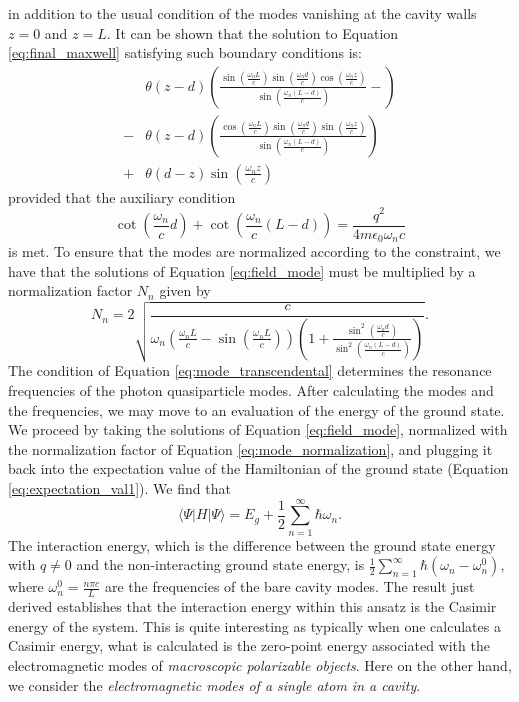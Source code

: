 \documentclass[aps,prb,twocolumn,
	groupedaddress,superscriptaddress,
	amsfonts,amssymb,amsmath,floatfix,
	citeautoscript]{revtex4-1}
\begin{document}
in addition to the usual condition of the modes vanishing at the cavity walls $z=0$ and $z=L$. It can be shown that the solution to Equation \ref{eq:final_maxwell} satisfying such boundary conditions is:
\begin{align}\label{eq:field_mode}
&\theta (z-d) \left(\frac{\sin\left(\frac{\omega_nL}{c}\right)\sin\left(\frac{\omega_nd}{c}\right)\cos\left(\frac{\omega_nz}{c}\right)}{\sin\left(\frac{\omega_n(L-d)}{c}\right)}-\right) \nonumber \\ 
-&\theta (z-d) \left(\frac{\cos\left(\frac{\omega_nL}{c}\right)\sin\left(\frac{\omega_nd}{c}\right)\sin\left(\frac{\omega_nz}{c}\right)}{\sin\left(\frac{\omega_n(L-d)}{c}\right)}\right) \nonumber \\ 
+&\theta (d-z) \sin\left(\frac{\omega_n z}{c} \right)
\end{align}
provided that the auxiliary condition
\begin{equation}\label{eq:mode_transcendental}
\cot\left(\frac{\omega_n}{c}d \right)+\cot\left(\frac{\omega_n}{c}(L-d) \right) = \frac{q^2}{4m\epsilon_0\omega_nc}
\end{equation}
is met. To ensure that the modes are normalized according to the constraint, we have that the solutions of Equation \ref{eq:field_mode} must be multiplied by a normalization factor $N_n$ given by
\begin{equation}\label{eq:mode_normalization}
N_n = 2\sqrt{\frac{c}{\omega_n\left(\frac{\omega_nL}{c}-\sin\left(\frac{\omega_nL}{c}\right) \right)\left(1+\frac{\sin^2\left(\frac{\omega_nd}{c}\right)}{\sin^2\left(\frac{\omega_n(L-d)}{c}\right)} \right)}}.
\end{equation}
The condition of Equation \ref{eq:mode_transcendental} determines the resonance frequencies of the photon quasiparticle modes. After calculating the modes and the frequencies, we may move to an evaluation of the energy of the ground state. We proceed by taking the solutions of Equation \ref{eq:field_mode}, normalized with the normalization factor of Equation \ref{eq:mode_normalization}, and plugging it back into the expectation value of the Hamiltonian of the ground state (Equation \ref{eq:expectation_val1}). We find that
\begin{equation}\label{eq:casimir}
\langle \Psi | H|\Psi\rangle = E_{g}+\frac{1}{2}\sum\limits_{n=1}^{\infty}\hbar\omega_n.
\end{equation}
The interaction energy, which is the difference between the ground state energy with $q\neq 0$ and the non-interacting ground state energy, is $\frac{1}{2}\sum\limits_{n=1}^{\infty}\hbar(\omega_n-\omega_n^0)$, where $\omega_n^0 = \frac{n\pi c}{L}$ are the frequencies of the bare cavity modes. The result just derived establishes that the interaction energy within this ansatz is the Casimir energy of the system. This is quite interesting as typically when one calculates a Casimir energy, what is calculated is the zero-point energy associated with the electromagnetic modes of \textit{macroscopic polarizable objects}. Here on the other hand, we consider the \textit{electromagnetic modes of a single atom in a cavity}.
\end{document}
